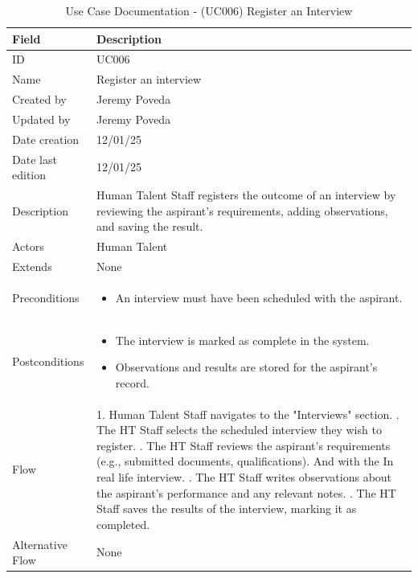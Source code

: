 \documentclass{scrreprt}
\begin{document}
\begin{table}[H]
	\centering
	\begin{tabular}{|p{3cm}|p{10cm}|}
		\hline
		\textbf{Field} & \textbf{Description} \\ \hline
		ID & UC006 \\ \hline
		Name & Register an interview \\ \hline
		Created by & Jeremy Poveda \\ \hline
		Updated by & Jeremy Poveda \\ \hline
		Date creation & 12/01/25 \\ \hline
		Date last edition & 12/01/25 \\ \hline
		Description & Human Talent Staff registers the outcome of an interview by reviewing the aspirant's requirements, adding observations, and saving the result. \\ \hline
		Actors & Human Talent \\ \hline
		Extends & None \\ \hline
		Preconditions & 
		\begin{itemize}
			\item An interview must have been scheduled with the aspirant.
		\end{itemize} \\ \hline
		Postconditions & 
		\begin{itemize}
			\item The interview is marked as complete in the system.
			\item Observations and results are stored for the aspirant's record.
		\end{itemize} \\ \hline
		Flow & 
		1. Human Talent Staff navigates to the "Interviews" section. \newline
		2. The HT Staff selects the scheduled interview they wish to register. \newline
		3. The HT Staff reviews the aspirant's requirements (e.g., submitted documents, qualifications). And with the In real life interview. \newline
		4. The HT Staff writes observations about the aspirant's performance and any relevant notes. \newline
		5. The HT Staff saves the results of the interview, marking it as completed. \\ \hline
		Alternative Flow & 
		None \\ \hline
	\end{tabular}
	\caption{Use Case Documentation - (UC006) Register an Interview}
	\label{table:UC006}
\end{table}
\end{document}
